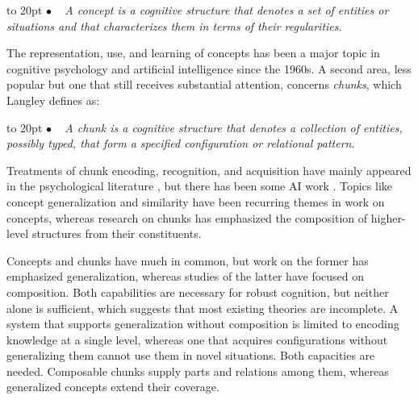 \documentclass[11pt,letterpaper]{article}
\def\texitem#1{\par\noindent\hangindent 20pt
               \hbox to 20pt {\hss #1 ~}\ignorespaces}
\def\bull{\texitem{$\bullet$}}
\begin{document}
\vskip 0.05in

\bull
  {\it A concept is a cognitive structure that denotes a set of                 
       entities or situations and that characterizes them in terms
       of their regularities\/}.

\vskip 0.05in
\noindent
The representation, use, and learning of concepts has been a major
topic in cognitive psychology \citep{rips-smith-medin} and artificial
intelligence \citep{langley-machine-learning} since the 1960s. A second
area, less popular but one that still receives substantial attention,
concerns {\it chunks}, which Langley defines as:

\vskip 0.05in

\bull
  {\it A chunk is a cognitive structure that denotes a collection of 
       entities, possibly typed, that form a specified configuration 
       or relational pattern\/}.

\vskip 0.05in
\noindent
Treatments of chunk encoding, recognition, and acquisition have mainly
appeared in the psychological literature
\citep{miller-magical-seven,fountain-doyle-chunking}, but there has
been some AI work \citep{campbell-berliner-chunks}. Topics like concept generalization and similarity have been recurring themes in work on 
concepts, whereas research on chunks has emphasized the composition 
of higher-level structures from their constituents.

% 
% 
% 

Concepts and chunks have much in common, but work on the former has
emphasized generalization, whereas studies of the latter have focused
on composition. Both capabilities are necessary for robust cognition, 
but neither alone is sufficient, which suggests that most existing 
theories are incomplete. A system that supports generalization 
without composition is limited to encoding knowledge at a single level, 
whereas one that acquires configurations without generalizing them 
cannot use them in novel situations. Both capacities are needed.  
Composable chunks supply parts and relations among them, whereas 
generalized concepts extend their coverage. 
\end{document}
